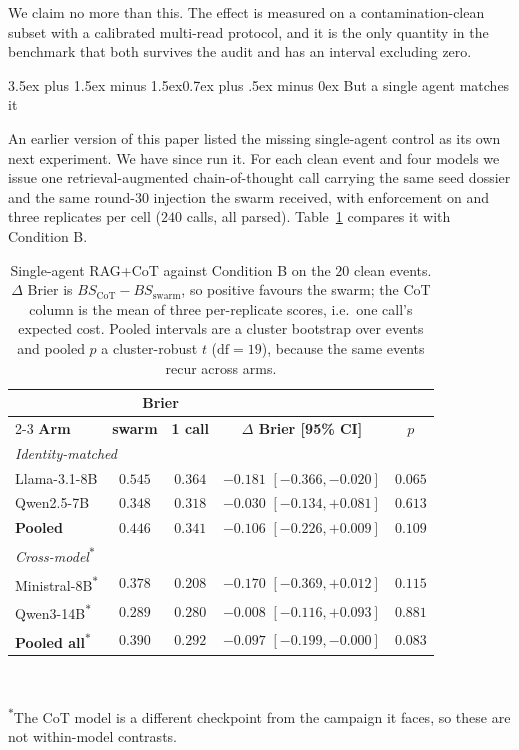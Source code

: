 \documentclass[10pt,conference]{IEEEtran}
\makeatletter
\renewcommand\subsection{\@startsection{subsection}{2}{\z@}%
  {3.5ex plus 1.5ex minus 1.5ex}{0.7ex plus .5ex minus 0ex}%
  {\normalfont\normalsize\bfseries}}
\makeatother
\begin{document}
We claim no more than this. The effect is measured on a contamination-clean subset with a calibrated multi-read protocol, and it is the only quantity in the benchmark that both survives the audit and has an interval excluding zero.

\subsection{But a single agent matches it}
\label{sec:cot_baseline}

An earlier version of this paper listed the missing single-agent control as its own next experiment. We have since run it. For each clean event and four models we issue one retrieval-augmented chain-of-thought call carrying the same seed dossier and the same round-$30$ injection the swarm received, with enforcement on and three replicates per cell ($240$ calls, all parsed). Table~\ref{tab:cot} compares it with Condition B.

\begin{table}[!t]
\centering
\caption{Single-agent RAG+CoT against Condition B on the $20$ clean events. $\Delta$ Brier is $BS_\mathrm{CoT} - BS_\mathrm{swarm}$, so positive favours the swarm; the CoT column is the mean of three per-replicate scores, i.e.\ one call's expected cost. Pooled intervals are a cluster bootstrap over events and pooled $p$ a cluster-robust $t$ ($\mathrm{df}=19$), because the same events recur across arms.}
\label{tab:cot}
\footnotesize
\setlength{\tabcolsep}{3pt}
\begin{tabular}{lcccc}
\toprule
 & \multicolumn{2}{c}{\textbf{Brier}} & & \\
\cmidrule(lr){2-3}
\textbf{Arm} & \textbf{swarm} & \textbf{1 call} & \textbf{$\Delta$ Brier [95\% CI]} & \textbf{$p$} \\
\midrule
\multicolumn{5}{l}{\emph{Identity-matched}} \\
Llama-3.1-8B  & $0.545$ & $\mathbf{0.364}$ & $-0.181$ $[-0.366, -0.020]$ & $0.065$ \\
Qwen2.5-7B    & $0.348$ & $\mathbf{0.318}$ & $-0.030$ $[-0.134, +0.081]$ & $0.613$ \\
\textbf{Pooled} & $0.446$ & $\mathbf{0.341}$ & $\mathbf{-0.106}$ $[-0.226, +0.009]$ & $0.109$ \\
\midrule
\multicolumn{5}{l}{\emph{Cross-model\textsuperscript{$\ast$}}} \\
Ministral-8B\textsuperscript{$\ast$}  & $0.378$ & $\mathbf{0.208}$ & $-0.170$ $[-0.369, +0.012]$ & $0.115$ \\
Qwen3-14B\textsuperscript{$\ast$}     & $0.289$ & $\mathbf{0.280}$ & $-0.008$ $[-0.116, +0.093]$ & $0.881$ \\
\textbf{Pooled all}\textsuperscript{$\ast$} & $0.390$ & $\mathbf{0.292}$ & $-0.097$ $[-0.199, -0.000]$ & $0.083$ \\
\bottomrule
\end{tabular}
\smallskip\\
\raggedright\footnotesize\textsuperscript{$\ast$}The CoT model is a different checkpoint from the campaign it faces, so these are not within-model contrasts.
\end{table}
\end{document}
